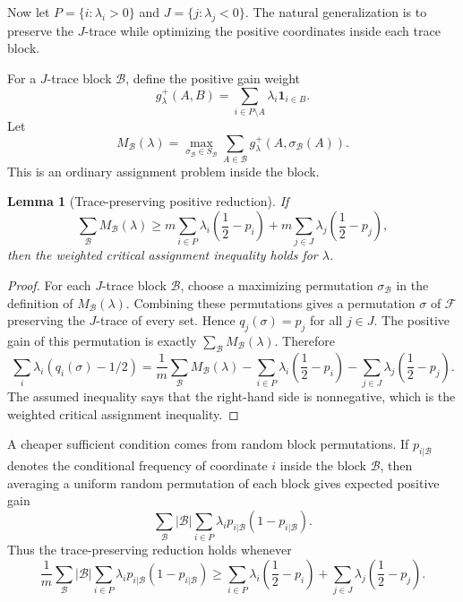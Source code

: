 \documentclass[11pt]{article}
\newtheorem{lemma}{Lemma}
\begin{document}
Now let $P=\{i:\lambda_i>0\}$ and $J=\{j:\lambda_j<0\}$.  The natural
generalization is to preserve the $J$-trace while optimizing the positive
coordinates inside each trace block.

For a $J$-trace block $\mathcal{B}$, define the positive gain weight
\[
  g^+_\lambda(A,B)
  =
  \sum_{i\in P\setminus A}\lambda_i\mathbf{1}_{i\in B}.
\]
Let
\[
  M_{\mathcal{B}}(\lambda)
  =
  \max_{\sigma_{\mathcal{B}}\in S_{\mathcal{B}}}
  \sum_{A\in\mathcal{B}} g^+_\lambda(A,\sigma_{\mathcal{B}}(A)).
\]
This is an ordinary assignment problem inside the block.

\begin{lemma}[Trace-preserving positive reduction]
If
\[
  \sum_{\mathcal{B}} M_{\mathcal{B}}(\lambda)
  \geq
  m\sum_{i\in P}\lambda_i\left(\frac12-p_i\right)
  +
  m\sum_{j\in J}\lambda_j\left(\frac12-p_j\right),
\]
then the weighted critical assignment inequality holds for $\lambda$.
\end{lemma}

\begin{proof}
For each $J$-trace block $\mathcal{B}$, choose a maximizing permutation
$\sigma_{\mathcal{B}}$ in the definition of $M_{\mathcal{B}}(\lambda)$.
Combining these permutations gives a permutation $\sigma$ of
$\mathcal{F}$ preserving the $J$-trace of every set.  Hence
$q_j(\sigma)=p_j$ for all $j\in J$.  The positive gain of this permutation is
exactly $\sum_{\mathcal{B}}M_{\mathcal{B}}(\lambda)$.  Therefore
\[
  \sum_i\lambda_i(q_i(\sigma)-1/2)
  =
  \frac1m\sum_{\mathcal{B}}M_{\mathcal{B}}(\lambda)
  -
  \sum_{i\in P}\lambda_i\left(\frac12-p_i\right)
  -
  \sum_{j\in J}\lambda_j\left(\frac12-p_j\right).
\]
The assumed inequality says that the right-hand side is nonnegative, which is
the weighted critical assignment inequality.
\end{proof}

A cheaper sufficient condition comes from random block permutations.  If
$p_{i|\mathcal{B}}$ denotes the conditional frequency of coordinate $i$ inside
the block $\mathcal{B}$, then averaging a uniform random permutation of each
block gives expected positive gain
\[
  \sum_{\mathcal{B}}|\mathcal{B}|
  \sum_{i\in P}\lambda_i
  p_{i|\mathcal{B}}(1-p_{i|\mathcal{B}}).
\]
Thus the trace-preserving reduction holds whenever
\[
  \frac1m
  \sum_{\mathcal{B}}|\mathcal{B}|
  \sum_{i\in P}\lambda_i
  p_{i|\mathcal{B}}(1-p_{i|\mathcal{B}})
  \geq
  \sum_{i\in P}\lambda_i\left(\frac12-p_i\right)
  +
  \sum_{j\in J}\lambda_j\left(\frac12-p_j\right).
\]
\end{document}
